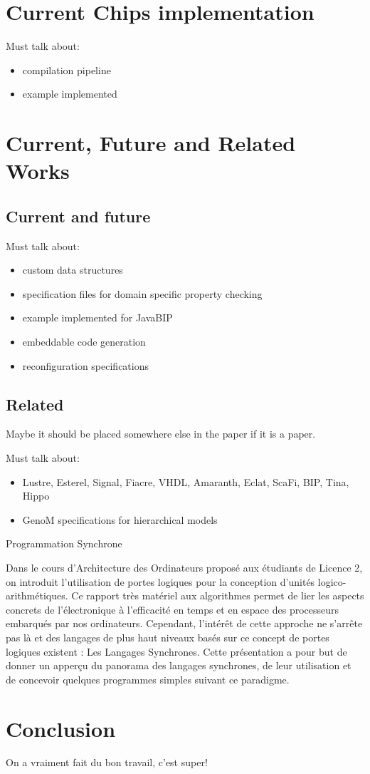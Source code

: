 \documentclass[runningheads]{llncs}
\begin{document}
\section{Current Chips implementation}
Must talk about:
\begin{itemize}
    \item compilation pipeline
    \item example implemented
\end{itemize}


\section{Current, Future and Related Works}

\subsection{Current and future}

Must talk about:
\begin{itemize}
    \item custom data structures
    \item specification files for domain specific property checking
    \item example implemented for JavaBIP
    \item embeddable code generation
    \item reconfiguration specifications
\end{itemize}

\subsection{Related}
Maybe it should be placed somewhere else in the paper if it is a paper.

Must talk about:
\begin{itemize}
    \item Lustre, Esterel, Signal, Fiacre, VHDL, Amaranth, Eclat, ScaFi, BIP, Tina, Hippo
    \item GenoM specifications for hierarchical models
\end{itemize}

Programmation Synchrone

Dans le cours d'Architecture des Ordinateurs proposé aux étudiants de Licence 2, on introduit l'utilisation de portes logiques pour la conception d'unités logico-arithmétiques. Ce rapport très matériel aux algorithmes permet de lier les aspects concrets de l'électronique à l'efficacité en temps et en espace des processeurs embarqués par nos ordinateurs. Cependant, l'intérêt de cette approche ne s'arrête pas là et des langages de plus haut niveaux basés sur ce concept de portes logiques existent : Les Langages Synchrones.
Cette présentation a pour but de donner un apperçu du panorama des langages synchrones, de leur utilisation et de concevoir quelques programmes simples suivant ce paradigme.


\section{Conclusion}

On a vraiment fait du bon travail, c'est super!

\printbibliography
\end{document}
